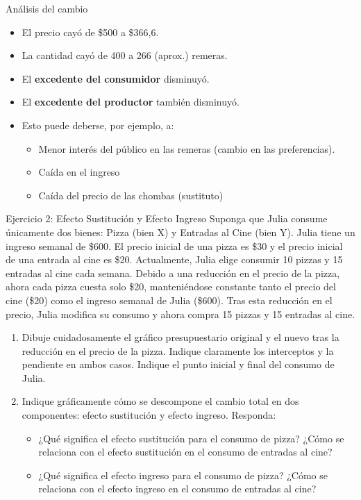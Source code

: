 \documentclass{beamer}
\begin{document}
\begin{frame}{Análisis del cambio}
\begin{itemize}
    \item El precio cayó de \$500 a \$366,6.
    \item La cantidad cayó de 400 a 266 (aprox.) remeras.
    \item El \textbf{excedente del consumidor} disminuyó.
    \item El \textbf{excedente del productor} también disminuyó.
    \item Esto puede deberse, por ejemplo, a:
        \begin{itemize}
            \item Menor interés del público en las remeras (cambio en las preferencias).
            \item Caída en el ingreso
            \item Caída del precio de las chombas (sustituto)
        \end{itemize}
\end{itemize}
\end{frame}

\begin{frame}{Ejercicio 2: Efecto Sustitución y Efecto Ingreso}
    \scriptsize
    Suponga que Julia consume únicamente dos bienes: Pizza (bien X) y Entradas al Cine (bien Y). Julia tiene un ingreso semanal de \$600. El precio inicial de una pizza es \$30 y el precio inicial de una entrada al cine es \$20. Actualmente, Julia elige consumir 10 pizzas y 15 entradas al cine cada semana.
    Debido a una reducción en el precio de la pizza, ahora cada pizza cuesta solo \$20, manteniéndose constante tanto el precio del cine (\$20) como el ingreso semanal de Julia (\$600). Tras esta reducción en el precio, Julia modifica su consumo y ahora compra 15 pizzas y 15 entradas al cine.
    \begin{enumerate}
        \item Dibuje cuidadosamente el gráfico presupuestario original y el nuevo tras la reducción en el precio de la pizza. Indique claramente los interceptos y la pendiente en ambos casos. Indique el punto inicial y final del consumo de Julia.
        \item Indique gráficamente cómo se descompone el cambio total en dos componentes: efecto sustitución y efecto ingreso. Responda:
        \begin{itemize}
            \scriptsize
            \item ¿Qué significa el efecto sustitución para el consumo de pizza? ¿Cómo se relaciona con el efecto sustitución en el consumo de entradas al cine?
            \item ¿Qué significa el efecto ingreso para el consumo de pizza? ¿Cómo se relaciona con el efecto ingreso en el consumo de entradas al cine?
        \end{itemize}
    \end{enumerate}
\end{frame}
\end{document}

